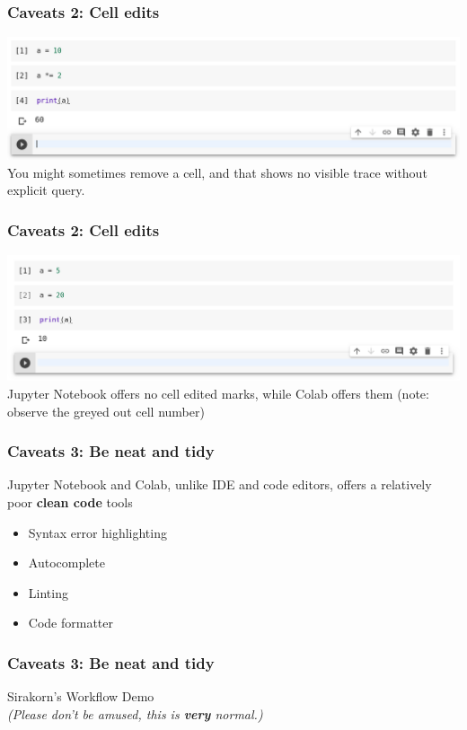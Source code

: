 \documentclass[aspectratio=169]{beamer}
\begin{document}
\begin{frame}
    \frametitle{Caveats 2: Cell edits}
    \includegraphics[width=\textwidth]{images/colab-removed-cell.png}
    \pause
    You might sometimes remove a cell, and that shows no visible trace without explicit query.
\end{frame}

\begin{frame}
    \frametitle{Caveats 2: Cell edits}
    \includegraphics[width=\textwidth]{images/colab-edited-cells.png}
    \pause
    Jupyter Notebook offers no cell edited marks, while Colab offers them
    \pause
    (note: observe the greyed out cell number)
\end{frame}

\begin{frame}
    \frametitle{Caveats 3: Be neat and tidy}
    Jupyter Notebook and Colab, unlike IDE and code editors, offers a relatively poor \textbf{clean code} tools
    \begin{itemize}
        \item Syntax error highlighting
        \item Autocomplete
        \item Linting
        \item Code formatter
    \end{itemize}
\end{frame}

\begin{frame}
    \frametitle{Caveats 3: Be neat and tidy}
    \centering
    {\LARGE Sirakorn's Workflow Demo}\\
     \textit{(Please don't be amused, this is \textbf{very} normal.)}
\end{frame}
\end{document}

